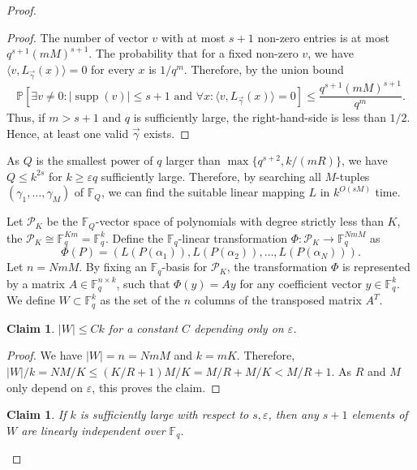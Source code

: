 \documentclass[11pt]{article}
\theoremstyle{plain}
\newtheorem{claim}[theorem]{Claim}
\theoremstyle{definition}
\DeclareMathOperator{\supp}{supp}
\begin{document}
\begin{proof}
\begin{proof}
The number of vector $v$ with at most $s+1$ non-zero entries is at most $q^{s+1}(mM)^{s+1}$. The probability that for a fixed non-zero $v$, we have $\langle v,L_{\vec{\gamma}}(x)\rangle=0$ for every $x$ is $1/q^m$. Therefore, by the union bound
$$\mathbb{P} \left[ \exists v \neq 0 : |\supp(v)|\leq s+1\text{ and }\forall x: \langle v,L_{\vec{\gamma}}(x)\rangle=0\right] \le \frac{q^{s+1}(mM)^{s+1}}{q^m}.$$
Thus, if $m>s+1$ and $q$ is sufficiently large, the right-hand-side is less than $1/2$.
Hence, at least one valid  $\vec{\gamma}$ exists.
\end{proof}

As $Q$ is the smallest power of $q$ larger than $\max\{q^{s+2},k/(mR)\}$, we have $Q\leq k^{2s}$ for $k\geq \varepsilon q$ sufficiently large. Therefore, by searching all $M$-tuples $(\gamma_1,\dots,\gamma_M)$ of $\mathbb{F}_Q$, we can find the suitable linear mapping $L$ in $k^{O(sM)}$ time.


Let $\mathcal{P}_K$ be the $\mathbb{F}_Q$-vector space of polynomials with degree strictly less than $K$, the $\mathcal{P}_K\cong \mathbb{F}_q^{Km}=\mathbb{F}_q^k$. Define the $\mathbb{F}_q$-linear transformation $\Phi : \mathcal{P}_K \to \mathbb{F}_q^{NmM}$ as $$\Phi(P) = \left( L(P(\alpha_1)), L(P(\alpha_2)), \dots, L(P(\alpha_N)) \right).$$
Let $n = NmM$. By fixing an $\mathbb{F}_q$-basis for $\mathcal{P}_K$, the transformation $\Phi$ is represented by a matrix $A \in \mathbb{F}_q^{n \times k}$, such that $\Phi(y) = Ay$ for any coefficient vector $y \in \mathbb{F}_q^k$. We define $W \subset \mathbb{F}_q^k$ as the set of the $n$ columns of the transposed matrix $A^T$.

\begin{claim}
$|W| \le Ck$ for a constant $C$ depending only on $\varepsilon$.
\end{claim}

\begin{proof} We have $|W| = n = NmM$ and $k=mK$. Therefore, $|W|/k=NM/K\leq (K/R+1)M/K=M/R+M/K<M/R+1$. As $R$ and $M$ only depend on $\varepsilon$, this proves the claim.
\end{proof}

\begin{claim}
 If $k$ is sufficiently large with respect to $s,\varepsilon$, then any $s+1$ elements of $W$ are linearly independent over $\mathbb{F}_q$.
 \end{claim}
 

\end{proof}
\end{document}
